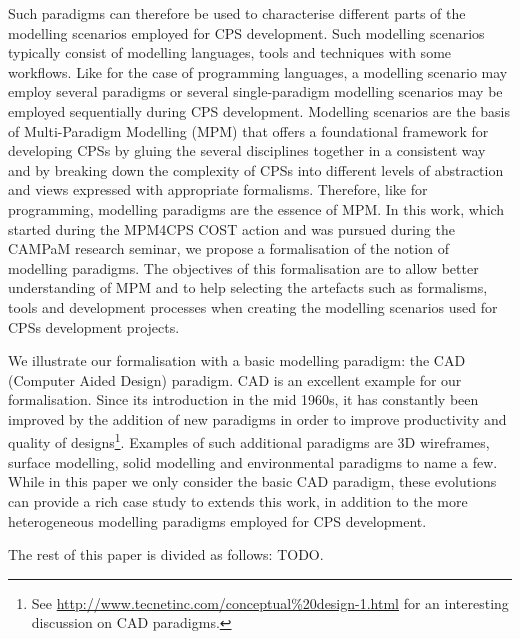 Such paradigms can therefore be used to characterise different parts of the modelling scenarios employed for CPS development. Such modelling scenarios typically consist of modelling languages, tools and techniques with some workflows. Like for the case of programming languages, a modelling scenario may employ several paradigms or several single-paradigm modelling scenarios may be employed sequentially during CPS development. Modelling scenarios are the basis of Multi-Paradigm Modelling (MPM) that offers a foundational framework for developing CPSs by gluing the several disciplines together in a consistent way and by breaking down the complexity of CPSs into different levels of abstraction and views expressed with appropriate formalisms.
Therefore, like for programming, modelling paradigms are the essence of MPM. 
In this work, which started during the MPM4CPS COST action and was pursued during the CAMPaM research seminar, we propose a formalisation of the notion of modelling paradigms. The objectives of this formalisation are to allow better understanding of MPM and to help selecting the artefacts such as formalisms, tools and development processes when creating  the modelling scenarios used for CPSs development projects. 

We illustrate our formalisation with a basic modelling paradigm: the CAD (Computer Aided Design) paradigm. CAD is an excellent example for our formalisation. Since its introduction in the mid 1960s, it has constantly been improved by the addition of new paradigms in order to improve productivity and quality of designs\footnote{See \url{http://www.tecnetinc.com/conceptual\%20design-1.html} for an interesting discussion on CAD paradigms.}. Examples of such additional paradigms are 3D wireframes, surface modelling, solid modelling and environmental paradigms to name a few. While in this paper we only consider the basic CAD paradigm, these evolutions can provide a rich case study to extends this work, in addition to the more heterogeneous modelling paradigms employed for CPS development.

The rest of this paper is divided as follows: TODO.

